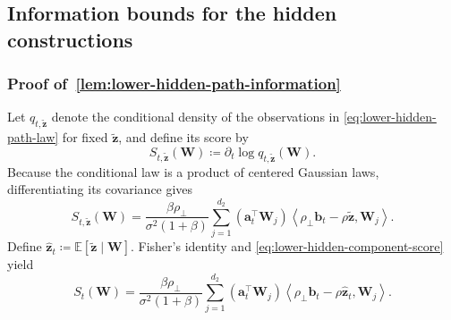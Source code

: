 \documentclass[11pt]{article}
\newcommand{\trans}{\top}
\begin{document}
\subsection{Information bounds for the hidden constructions}

\subsubsection{Proof of~\cref{lem:lower-hidden-path-information}}

Let $q_{t,\widetilde{\bm z}}$ denote the conditional density of the
observations in \cref{eq:lower-hidden-path-law} for fixed
$\widetilde{\bm z}$, and define its score by
\begin{equation}
  S_{t,\widetilde{\bm z}}(\bm W)
  \coloneqq
  \partial_t\log q_{t,\widetilde{\bm z}}(\bm W).
\label{eq:lower-hidden-conditional-score-definition}
\end{equation}
Because the conditional law is a product of centered Gaussian laws,
differentiating its covariance gives
\begin{equation}
  S_{t,\widetilde{\bm z}}(\bm W)
  =
  \frac{\beta\rho_\perp}{\sigma^2(1+\beta)}
  \sum_{j=1}^{d_2}
  (\bm a_t^\trans\bm W_j)
  \left\langle
    \rho_\perp\bm b_t-\rho\widetilde{\bm z},\bm W_j
  \right\rangle.
\label{eq:lower-hidden-component-score}
\end{equation}
Define
$\widehat{\bm z}_t\coloneqq
\mathbb E[\widetilde{\bm z}\mid\bm W]$.  Fisher's identity and
\cref{eq:lower-hidden-component-score} yield
\begin{equation}
  S_t(\bm W)
  =
  \frac{\beta\rho_\perp}{\sigma^2(1+\beta)}
  \sum_{j=1}^{d_2}
  (\bm a_t^\trans\bm W_j)
  \left\langle
    \rho_\perp\bm b_t-\rho\widehat{\bm z}_t,\bm W_j
  \right\rangle.
\label{eq:lower-hidden-mixture-score}
\end{equation}
\end{document}
